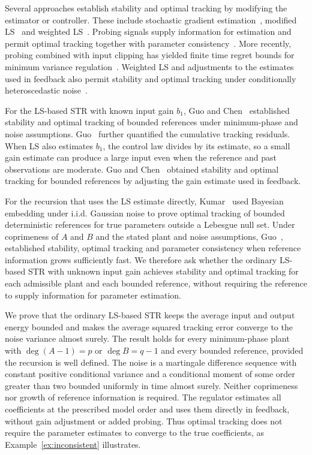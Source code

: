 \documentclass[11pt,reqno]{amsart}
\numberwithin{equation}{section}
\theoremstyle{definition}
\theoremstyle{remark}
\begin{document}
Several approaches establish stability and optimal tracking by modifying the estimator or controller. These include stochastic gradient estimation~\cite{GRC80}, modified LS~\cite{SG82,Chen84} and weighted LS~\cite{Bercu95}. Probing signals supply information for estimation and permit optimal tracking together with parameter consistency~\cite{CG87,LW87,BV10PE}. More recently, probing combined with input clipping has yielded finite time regret bounds for minimum variance regulation~\cite{Singh24}. Weighted LS and adjustments to the estimates used in feedback also permit stability and optimal tracking under conditionally heteroscedastic noise~\cite{ZG21}.

For the LS-based STR with known input gain $b_1$, Guo and Chen~\cite[Theorem~1]{GC91} established stability and optimal tracking of bounded references under minimum-phase and noise assumptions. Guo~\cite[Theorem~4.1]{Guo95} further quantified the cumulative tracking residuals. When LS also estimates $b_1$, the control law divides by its estimate, so a small gain estimate can produce a large input even when the reference and past observations are moderate. Guo and Chen~\cite[Theorem~2]{GC91} obtained stability and optimal tracking for bounded references by adjusting the gain estimate used in feedback.

For the recursion that uses the LS estimate directly, Kumar~\cite{Kumar90} used Bayesian embedding under i.i.d. Gaussian noise to prove optimal tracking of bounded deterministic references for true parameters outside a Lebesgue null set. Under coprimeness of $A$ and $B$ and the stated plant and noise assumptions, Guo~\cite[Theorem~4.2]{Guo94}, \cite[Theorem~7.2]{Guo95} established stability, optimal tracking and parameter consistency when reference information grows sufficiently fast. We therefore ask whether the ordinary LS-based STR with unknown input gain achieves stability and optimal tracking for each admissible plant and each bounded reference, without requiring the reference to supply information for parameter estimation.

We prove that the ordinary LS-based STR keeps the average input and output energy bounded and makes the average squared tracking error converge to the noise variance almost surely. The result holds for every minimum-phase plant with $\deg(A-1)=p$ or $\deg B=q-1$ and every bounded reference, provided the recursion is well defined. The noise is a martingale difference sequence with constant positive conditional variance and a conditional moment of some order greater than two bounded uniformly in time almost surely. Neither coprimeness nor growth of reference information is required. The regulator estimates all coefficients at the prescribed model order and uses them directly in feedback, without gain adjustment or added probing. Thus optimal tracking does not require the parameter estimates to converge to the true coefficients, as Example~\ref{ex:inconsistent} illustrates.
\end{document}
